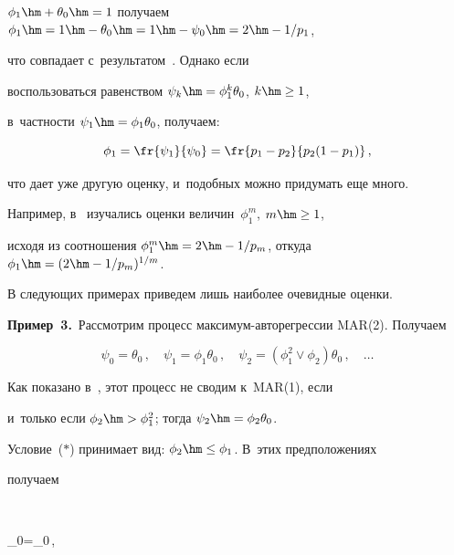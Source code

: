 $\phi_1\hm+\theta_0\hm=1$ получаем $\phi_1\hm=1\hm-\theta_0\hm=1\hm-\psi_0\hm=2\hm-1/p_1$,


что совпадает с~результатом~\cite[следствие~1]{Leb1}. Однако если


воспользоваться равенством $\psi_k\hm=\phi_1^k\theta_0$, $k\hm\ge 1$, 


в~част\-ности $\psi_1\hm=\phi_1\theta_0$, получаем:


$$


\phi_1=\fr{\psi_1}{\psi_0}=\fr{p_1-p_2}{p_2(1-p_1)}\,,


$$


что дает уже другую оценку, и~подобных можно придумать еще много.





Например, в~\cite{Ferr} изучались оценки величин~$\phi_1^m$, $m\hm\ge 1$,


исходя из соотношения $\phi_1^m\hm=2\hm-1/p_m$, откуда $\phi_1\hm=(2\hm-1/p_m)^{1/m}$.





\smallskip





В следующих примерах приведем лишь наиболее очевидные оценки.





\smallskip





\noindent


\textbf{Пример~3.}\ Рассмотрим процесс максимум-авторегрессии MAR(2). Получаем


$$


\psi_0=\theta_0\,,\quad


\psi_1=\phi_1\theta_0\,,\quad


\psi_2=(\phi_1^2\vee\phi_2)\theta_0\,,\quad\dots


$$


Как показано в~\cite{DR1}, этот процесс не сводим к~MAR(1), если


и~только если $\phi_2\hm>\phi_1^2$; тогда $\psi_2\hm=\phi_2\theta_0$.


Условие~($*$) принимает вид: $\phi_2\hm\le\phi_1$. В~этих предположениях


получаем


$$


\theta_0=\psi_0\,,\quad


